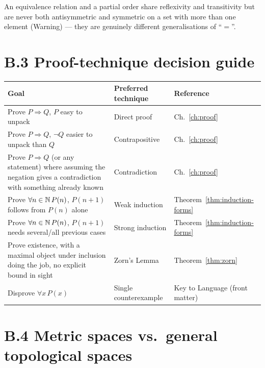 An equivalence relation and a partial order share reflexivity and transitivity but are never both antisymmetric and symmetric on a set with more than one element (Warning) --- they are genuinely different generalisations of ``$=$''.

\section*{B.3 Proof-technique decision guide}

\begin{center}
\begin{tabular}{@{}p{3.3cm}p{6.2cm}p{4.2cm}@{}}
	\toprule
	\textbf{Goal} & \textbf{Preferred technique} & \textbf{Reference}\\
	\midrule
	Prove $P\Rightarrow Q$, $P$ easy to unpack & Direct proof & Ch.~\ref{ch:proof}\\
	Prove $P\Rightarrow Q$, $\neg Q$ easier to unpack than $Q$ & Contrapositive & Ch.~\ref{ch:proof}\\
	Prove $P\Rightarrow Q$ (or any statement) where assuming the negation gives a contradiction with something already known & Contradiction & Ch.~\ref{ch:proof}\\
	Prove $\forall n\in\mathbb{N}\,P(n)$, $P(n{+}1)$ follows from $P(n)$ alone & Weak induction & Theorem~\ref{thm:induction-forms}\\
	Prove $\forall n\in\mathbb{N}\,P(n)$, $P(n{+}1)$ needs several/all previous cases & Strong induction & Theorem~\ref{thm:induction-forms}\\
	Prove existence, with a maximal object under inclusion doing the job, no explicit bound in sight & Zorn's Lemma & Theorem~\ref{thm:zorn}\\
	Disprove $\forall x\,P(x)$ & Single counterexample & Key to Language (front matter)\\
	\bottomrule
\end{tabular}
\end{center}

\section*{B.4 Metric spaces vs.\ general topological spaces}

